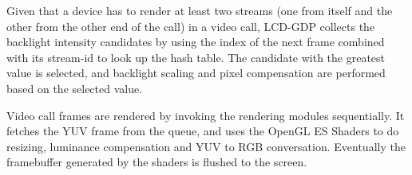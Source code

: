 Given that a device has to render at least two streams 
(one from itself and the other from the other end of the call) in a video call,
LCD-GDP collects the backlight intensity candidates by using the index of the next
frame combined with its stream-id to look up the hash table.
The candidate with the greatest value is selected, and 
backlight scaling and pixel compensation are performed based on the selected value.

Video call frames are rendered by invoking the rendering modules
sequentially. It fetches the YUV frame from the queue, and uses the
OpenGL ES Shaders to do resizing, luminance compensation and YUV to RGB
conversation. Eventually the framebuffer generated by the shaders is
flushed to the screen. 








